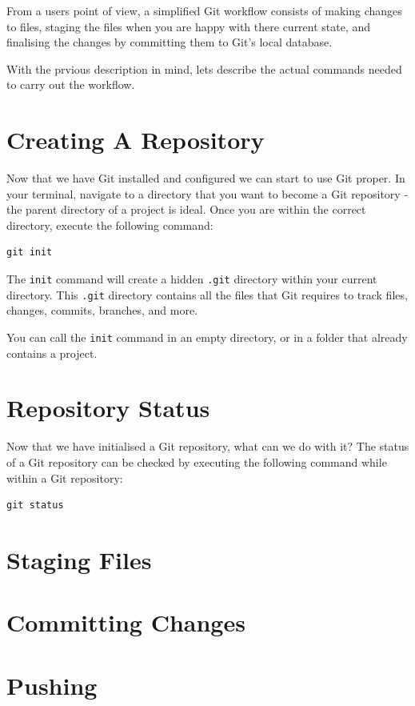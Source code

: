 \documentclass[11pt, a4paper, titlepage]{article}
\begin{document}
From a users point of view, a simplified Git workflow consists of making
changes to files, staging the files when you are happy with there current
state, and finalising the changes by committing them to Git's local database.

With the prvious description in mind, lets describe the actual commands needed
to carry out the workflow.

\section{Creating A Repository}
Now that we have Git installed and configured we can start to use Git proper.
In your terminal, navigate to a directory that you want to become a Git
repository - the parent directory of a project is ideal.
Once you are within the correct directory, execute the following command:

\begin{lstlisting}[label=lst_init,
caption=Initialisin a new Git repository]
 git init 
\end{lstlisting}

The {\tt init} command will create a hidden {\tt .git} directory within your
current directory.
This {\tt .git} directory contains all the files that  Git requires to track
files, changes, commits, branches, and more.

You can call the {\tt init} command in an empty directory, or in a folder that
already contains a project.



\section{Repository Status}
Now that we have initialised a Git repository, what can we do with it?
The status of a Git repository can be checked by executing the following
command while within a Git repository:

\begin{lstlisting}[label=lst_status,
caption=Initialisin a new Git repository]
 git status
\end{lstlisting}



\section{Staging Files}



\section{Committing Changes}



\section{Pushing}
\end{document}
